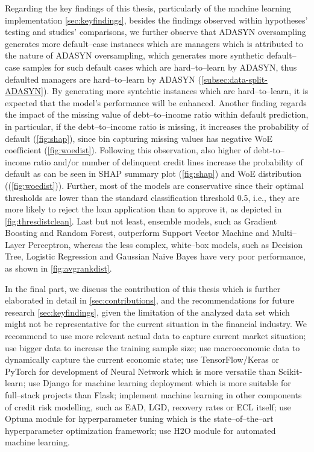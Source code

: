 Regarding the key findings of this thesis, particularly of the machine learning implementation \autoref{sec:keyfindings}, besides the findings observed within hypotheses' testing and studies' comparisons, we further observe that ADASYN oversampling generates more default--case instances which are managers
which is attributed to the nature of ADASYN oversampling,
which generates more synthetic default--case samples for such default cases which are hard--to--learn by ADASYN,
thus defaulted managers are hard--to--learn by ADASYN (\autoref{subsec:data-split-ADASYN}).
By generating more syntehtic instances which are hard--to--learn, it is expected that the model's performance will be enhanced.
Another finding regards the impact of the missing value of debt--to--income ratio within default prediction, in particular, if the debt--to--income ratio is missing, it increases the probability of default (\autoref{fig:shap}), since bin capturing missing values has negative WoE coefficient (\autoref{fig:woedist}).
Following this observation, also higher of debt-to--income ratio and/or number of delinquent credit lines increase the probability of default as can be seen in SHAP summary plot (\autoref{fig:shap}) and WoE distribution ((\autoref{fig:woedist})).
Further, most of the models are conservative since their optimal thresholds are lower than the standard classification threshold 0.5, i.e., they are more likely to reject the loan application than to approve it, as depicted in \autoref{fig:thresdistclean}.
Last but not least, ensemble models, such as Gradient Boosting and Random Forest, outperform Support Vector Machine and Multi--Layer Perceptron, whereas the less complex, white--box models, such as Decision Tree, Logistic Regression and Gaussian Naive Bayes have very poor performance, as shown in \autoref{fig:avgrankdist}.

In the final part, we discuss the contribution of this thesis which is further elaborated in detail in \autoref{sec:contributions}, and the recommendations for future research \autoref{sec:keyfindings}, given the limitation of the analyzed data set which might not be representative for the current situation in the financial industry.
We recommend to use more relevant actual data to capture current market situation; use bigger data to increase the training sample size; use macroeconomic data to dynamically capture the current economic state;
use TensorFlow/Keras or PyTorch for development of Neural Network which is more versatile than Scikit-learn; use Django for machine learning deployment which is more suitable for full--stack projects than Flask;
implement machine learning in other components of credit risk modelling, such as EAD, LGD, recovery rates or ECL itself; use Optuna module for hyperparameter tuning which is the state--of--the--art hyperparameter optimization framework; use H2O module for automated machine learning.